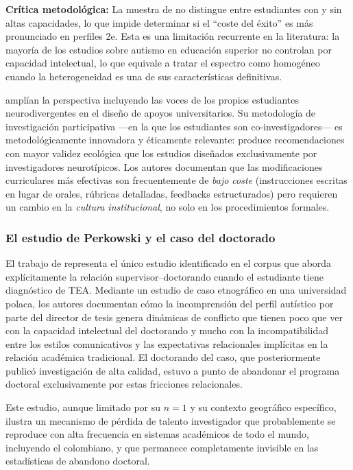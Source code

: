 \textbf{Crítica metodológica:} La muestra de \textcite{macleod2017} no
distingue entre estudiantes con y sin altas capacidades, lo que impide
determinar si el ``coste del éxito'' es más pronunciado en perfiles 2e. Esta
es una limitación recurrente en la literatura: la mayoría de los estudios
sobre autismo en educación superior no controlan por capacidad intelectual,
lo que equivale a tratar el espectro como homogéneo cuando la heterogeneidad
es una de sus características definitivas.

\textcite{gillespie-lynch2017} amplían la perspectiva incluyendo las voces de
los propios estudiantes neurodivergentes en el diseño de apoyos universitarios.
Su metodología de investigación participativa —en la que los estudiantes son
co-investigadores— es metodológicamente innovadora y éticamente relevante:
produce recomendaciones con mayor validez ecológica que los estudios diseñados
exclusivamente por investigadores neurotípicos. Los autores documentan que las
modificaciones curriculares más efectivas son frecuentemente de \textit{bajo
coste} (instrucciones escritas en lugar de orales, rúbricas detalladas,
feedbacks estructurados) pero requieren un cambio en la \textit{cultura
institucional}, no solo en los procedimientos formales.

\subsubsection{El estudio de Perkowski y el caso del doctorado}

El trabajo de \textcite{perkowski2017} representa el único estudio identificado
en el corpus que aborda explícitamente la relación supervisor--doctorando cuando
el estudiante tiene diagnóstico de TEA. Mediante un estudio de caso etnográfico
en una universidad polaca, los autores documentan cómo la incomprensión del
perfil autístico por parte del director de tesis genera dinámicas de conflicto
que tienen poco que ver con la capacidad intelectual del doctorando y mucho con
la incompatibilidad entre los estilos comunicativos y las expectativas relacionales
implícitas en la relación académica tradicional. El doctorando del caso, que
posteriormente publicó investigación de alta calidad, estuvo a punto de abandonar
el programa doctoral exclusivamente por estas fricciones relacionales.

Este estudio, aunque limitado por su $n=1$ y su contexto geográfico específico,
ilustra un mecanismo de pérdida de talento investigador que probablemente se
reproduce con alta frecuencia en sistemas académicos de todo el mundo, incluyendo
el colombiano, y que permanece completamente invisible en las estadísticas de
abandono doctoral.


